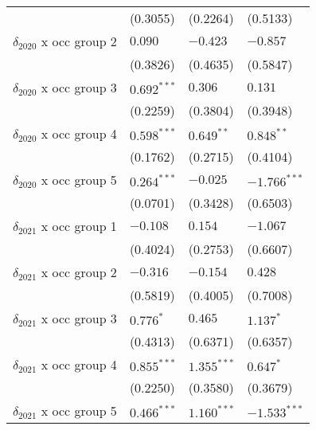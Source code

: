 \begin{tabular}{llll}
                                       &           (0.3055) &           (0.2264) &           (0.5133) \\
$\delta_{2020}$ x occ group 2          &            $0.090$ &           $-0.423$ &           $-0.857$ \\
                                       &           (0.3826) &           (0.4635) &           (0.5847) \\
$\delta_{2020}$ x occ group 3          &      $0.692^{***}$ &            $0.306$ &            $0.131$ \\
                                       &           (0.2259) &           (0.3804) &           (0.3948) \\
$\delta_{2020}$ x occ group 4          &      $0.598^{***}$ &       $0.649^{**}$ &       $0.848^{**}$ \\
                                       &           (0.1762) &           (0.2715) &           (0.4104) \\
$\delta_{2020}$ x occ group 5          &      $0.264^{***}$ &           $-0.025$ &     $-1.766^{***}$ \\
                                       &           (0.0701) &           (0.3428) &           (0.6503) \\
$\delta_{2021}$ x occ group 1          &           $-0.108$ &            $0.154$ &           $-1.067$ \\
                                       &           (0.4024) &           (0.2753) &           (0.6607) \\
$\delta_{2021}$ x occ group 2          &           $-0.316$ &           $-0.154$ &            $0.428$ \\
                                       &           (0.5819) &           (0.4005) &           (0.7008) \\
$\delta_{2021}$ x occ group 3          &          $0.776^*$ &            $0.465$ &          $1.137^*$ \\
                                       &           (0.4313) &           (0.6371) &           (0.6357) \\
$\delta_{2021}$ x occ group 4          &      $0.855^{***}$ &      $1.355^{***}$ &          $0.647^*$ \\
                                       &           (0.2250) &           (0.3580) &           (0.3679) \\
$\delta_{2021}$ x occ group 5          &      $0.466^{***}$ &      $1.160^{***}$ &     $-1.533^{***}$ \\

\end{tabular}
